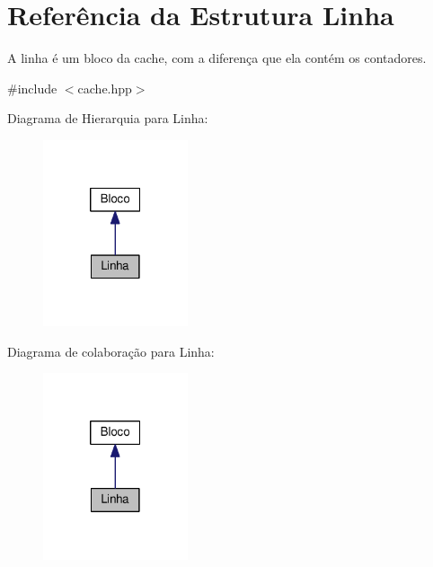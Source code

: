 \hypertarget{structLinha}{}\section{Referência da Estrutura Linha}
\label{structLinha}


A linha é um bloco da cache, com a diferença que ela contém os contadores.  




{\ttfamily \#include $<$cache.\+hpp$>$}



Diagrama de Hierarquia para Linha\+:\nopagebreak
\begin{figure}[H]
\begin{center}
\leavevmode
\includegraphics[width=121pt]{structLinha__inherit__graph}
\end{center}
\end{figure}


Diagrama de colaboração para Linha\+:\nopagebreak
\begin{figure}[H]
\begin{center}
\leavevmode
\includegraphics[width=121pt]{structLinha__coll__graph}
\end{center}
\end{figure}
